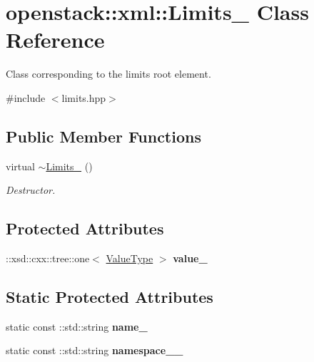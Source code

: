 \hypertarget{classopenstack_1_1xml_1_1Limits__}{
\section{openstack::xml::Limits\_\- Class Reference}
\label{classopenstack_1_1xml_1_1Limits__}
}


Class corresponding to the limits root element.  




{\ttfamily \#include $<$limits.hpp$>$}

\subsection*{Public Member Functions}
\begin{DoxyCompactItemize}
\item 
\hypertarget{classopenstack_1_1xml_1_1Limits___a44d67b908aeb1c451d85346e6f68b5d8}{
virtual \hyperlink{classopenstack_1_1xml_1_1Limits___a44d67b908aeb1c451d85346e6f68b5d8}{$\sim$Limits\_\-} ()}
\label{classopenstack_1_1xml_1_1Limits___a44d67b908aeb1c451d85346e6f68b5d8}

\begin{DoxyCompactList}\small\item\em Destructor. \item\end{DoxyCompactList}\end{DoxyCompactItemize}
\subsection*{Protected Attributes}
\begin{DoxyCompactItemize}
\item 
\hypertarget{classopenstack_1_1xml_1_1Limits___ad6f0a5124bfacd629dcfd2c4f8fa90f5}{
::xsd::cxx::tree::one$<$ \hyperlink{classopenstack_1_1xml_1_1Limits}{ValueType} $>$ {\bfseries value\_\-}}
\label{classopenstack_1_1xml_1_1Limits___ad6f0a5124bfacd629dcfd2c4f8fa90f5}

\end{DoxyCompactItemize}
\subsection*{Static Protected Attributes}
\begin{DoxyCompactItemize}
\item 
\hypertarget{classopenstack_1_1xml_1_1Limits___aa53d75f2572de7a5cee84131a05bcf12}{
static const ::std::string {\bfseries name\_\-}}
\label{classopenstack_1_1xml_1_1Limits___aa53d75f2572de7a5cee84131a05bcf12}

\item 
\hypertarget{classopenstack_1_1xml_1_1Limits___ae3fe60ebb723dafc1bce4fb9b18da85a}{
static const ::std::string {\bfseries namespace\_\-\_\-}}
\label{classopenstack_1_1xml_1_1Limits___ae3fe60ebb723dafc1bce4fb9b18da85a}

\end{DoxyCompactItemize}
